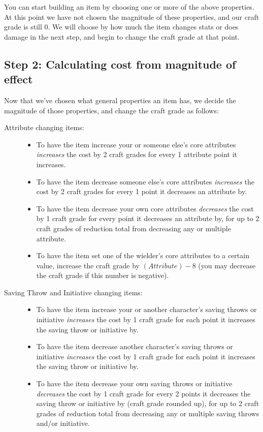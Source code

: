 You can start building an item by choosing one or more of the above properties. At this point we have not chosen the magnitude of these properties, and our craft grade is still 0. We will choose by how much the item changes stats or does damage in the next step, and begin to change the craft grade at that point.

\subsection{Step 2: Calculating cost from magnitude of effect}
Now that we've chosen what general properties an item has, we decide the magnitude of those properties, and change the craft grade as follows:
\begin{description}
	\item[Attribute changing items:] \hfill
	\begin{itemize}
		\item To have the item increase your or someone else's core attributes \emph{increases} the cost by 2 craft grades for every 1 attribute point it increases.
		\item To have the item decrease someone else's core attributes \emph{increases} the cost by 2 craft grades for every 1 point it decreases an attribute by.
		\item To have the item decrease your own core attributes \emph{decreases} the cost by 1 craft grade for every point it decreases an attribute by, for up to 2 craft grades of reduction total from decreasing any or multiple attribute.
		\item To have the item set one of the wielder's core attributes to a certain value, increase the craft grade by $(Attribute)-8$ (you may decrease the craft grade if this number is negative).
	\end{itemize}
	\item [Saving Throw and Initiative changing items:] \hfill
	\begin{itemize}
		\item To have the item increase your or another character's saving throws or initiative \emph{increases} the cost by 1 craft grade for each point it increases the saving throw or initiative by.
		\item To have the item decrease another character's saving throws or initiative \emph{increases} the cost by 1 craft grade for each point it increases the saving throw or initiative by.
		\item To have the item decrease your own saving throws or initiative \emph{decreases} the cost by 1 craft grade for every 2 points it decreases the saving throw or initiative by (craft grade rounded up), for up to 2 craft grades of reduction total from decreasing any or multiple saving throws and/or initiative.

\end{itemize}
\end{description}
